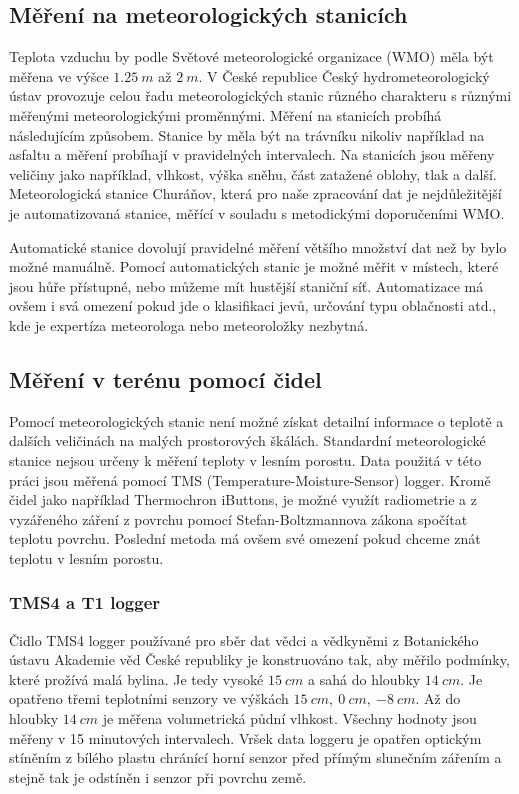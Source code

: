 \subsection{Měření na meteorologických stanicích}\label{chap:meteostations}
Teplota vzduchu by podle Světové meteorologické organizace (WMO) měla být měřena ve výšce $\SI{1.25}{m}$ až $\SI{2}{m}$\cite{wmo2021}. V České republice Český hydrometeorologický ústav provozuje celou řadu meteorologických stanic různého charakteru s různými měřenými meteorologickými proměnnými. Měření na stanicích probíhá následujícím způsobem. Stanice by měla být na trávníku nikoliv například na asfaltu a měření probíhají v pravidelných intervalech. Na stanicích jsou měřeny veličiny jako například, vlhkost, výška sněhu, část zatažené oblohy, tlak a další\cite{chmustanice}. Meteorologická stanice Churáňov, která pro naše zpracování dat je nejdůležitější je automatizovaná stanice, měřící v souladu s metodickými doporučeními WMO\cite{chmustanice2}.

Automatické stanice dovolují pravidelné měření většího množství dat než by bylo možné manuálně. Pomocí automatických stanic je možné měřit v místech, které jsou hůře přístupné, nebo můžeme mít hustější staniční síť. Automatizace má ovšem i svá omezení pokud jde o klasifikaci jevů, určování typu oblačnosti atd., kde je expertíza meteorologa nebo meteoroložky nezbytná\cite{automatisation}.

\subsection{Měření v terénu pomocí čidel}
Pomocí meteorologických stanic není možné získat detailní informace o teplotě a dalších veličinách na malých prostorových škálách. Standardní meteorologické stanice nejsou určeny k měření teploty v lesním porostu. Data použitá v této práci jsou měřená pomocí TMS (Temperature-Moisture-Sensor) logger. Kromě čidel jako například Thermochron iButtons, je možné využít radiometrie a z vyzářeného záření z povrchu pomocí Stefan-Boltzmannova zákona spočítat teplotu povrchu. Poslední metoda má ovšem své omezení pokud chceme znát teplotu v lesním porostu. 

\subsubsection{TMS4 a T1 logger} \label{chap:loggers}
Čidlo TMS4 logger používané pro sběr dat vědci a vědkyněmi z Botanického ústavu Akademie věd České republiky je konstruováno tak, aby měřilo podmínky, které prožívá malá bylina. Je tedy vysoké $\SI{15}{cm}$ a sahá do hloubky $\SI{14}{cm}$. Je opatřeno třemi teplotními senzory ve výškách $\SI{15}{cm},\ \SI{0}{cm},\ \SI{-8}{cm}$. Až do hloubky $\SI{14}{cm}$ je měřena volumetrická půdní vlhkost. Všechny hodnoty jsou měřeny v 15 minutových intervalech. Vršek data loggeru je opatřen optickým stíněním z bílého plastu chránící horní senzor před přímým slunečním zářením a stejně tak je odstíněn i senzor při povrchu země. 

